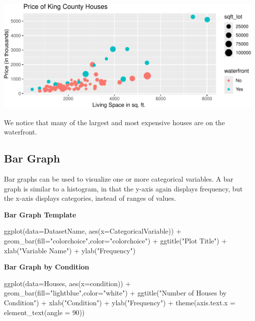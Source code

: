 \documentclass[
  letterpaper,
  DIV=11,
  numbers=noendperiod]{scrreprt}
\newenvironment{Shaded}{\begin{snugshade}}{\end{snugshade}}
\newcommand{\AttributeTok}[1]{\textcolor[rgb]{0.40,0.45,0.13}{#1}}
\newcommand{\DecValTok}[1]{\textcolor[rgb]{0.68,0.00,0.00}{#1}}
\newcommand{\FunctionTok}[1]{\textcolor[rgb]{0.28,0.35,0.67}{#1}}
\newcommand{\NormalTok}[1]{\textcolor[rgb]{0.00,0.23,0.31}{#1}}
\newcommand{\SpecialCharTok}[1]{\textcolor[rgb]{0.37,0.37,0.37}{#1}}
\newcommand{\StringTok}[1]{\textcolor[rgb]{0.13,0.47,0.30}{#1}}
\begin{document}
\includegraphics{Ch1_files/figure-pdf/unnamed-chunk-24-1.pdf}

We notice that many of the largest and most expensive houses are on the
waterfront.

\subsection{Bar Graph}\label{bar-graph}

Bar graphs can be used to visualize one or more categorical variables. A
bar graph is similar to a histogram, in that the y-axis again displays
frequency, but the x-axis displays categories, instead of ranges of
values.

\textbf{Bar Graph Template}

\begin{Shaded}
\begin{Highlighting}[]
\FunctionTok{ggplot}\NormalTok{(}\AttributeTok{data=}\NormalTok{DatasetName, }\FunctionTok{aes}\NormalTok{(}\AttributeTok{x=}\NormalTok{CategoricalVariable)) }\SpecialCharTok{+} 
  \FunctionTok{geom\_bar}\NormalTok{(}\AttributeTok{fill=}\StringTok{"colorchoice"}\NormalTok{,}\AttributeTok{color=}\StringTok{"colorchoice"}\NormalTok{)  }\SpecialCharTok{+} 
  \FunctionTok{ggtitle}\NormalTok{(}\StringTok{"Plot Title"}\NormalTok{) }\SpecialCharTok{+} 
  \FunctionTok{xlab}\NormalTok{(}\StringTok{"Variable Name"}\NormalTok{) }\SpecialCharTok{+} 
  \FunctionTok{ylab}\NormalTok{(}\StringTok{"Frequency"}\NormalTok{) }
\end{Highlighting}
\end{Shaded}

\textbf{Bar Graph by Condition}

\begin{Shaded}
\begin{Highlighting}[]
\FunctionTok{ggplot}\NormalTok{(}\AttributeTok{data=}\NormalTok{Houses, }\FunctionTok{aes}\NormalTok{(}\AttributeTok{x=}\NormalTok{condition)) }\SpecialCharTok{+} 
  \FunctionTok{geom\_bar}\NormalTok{(}\AttributeTok{fill=}\StringTok{"lightblue"}\NormalTok{,}\AttributeTok{color=}\StringTok{"white"}\NormalTok{)  }\SpecialCharTok{+} 
  \FunctionTok{ggtitle}\NormalTok{(}\StringTok{"Number of Houses by Condition"}\NormalTok{) }\SpecialCharTok{+} 
  \FunctionTok{xlab}\NormalTok{(}\StringTok{"Condition"}\NormalTok{) }\SpecialCharTok{+} 
  \FunctionTok{ylab}\NormalTok{(}\StringTok{"Frequency"}\NormalTok{) }\SpecialCharTok{+}   
  \FunctionTok{theme}\NormalTok{(}\AttributeTok{axis.text.x =} \FunctionTok{element\_text}\NormalTok{(}\AttributeTok{angle =} \DecValTok{90}\NormalTok{))}
\end{Highlighting}
\end{Shaded}
\end{document}
